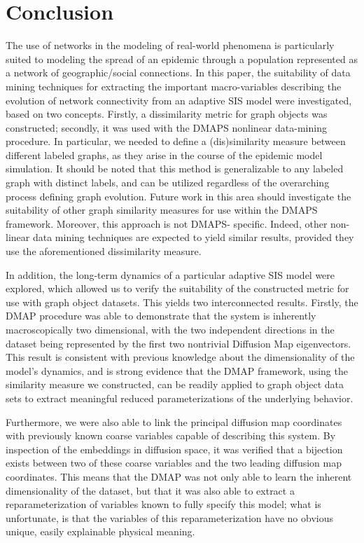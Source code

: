 \section{Conclusion}

The use of networks in the modeling of real-world phenomena is
particularly suited to modeling the spread of an epidemic through a
population represented as a network of geographic/social
connections. In this paper, the suitability of data mining techniques
for extracting the important macro-variables describing the evolution
of network connectivity from an adaptive SIS model were investigated,
based on two concepts. Firstly, a dissimilarity metric for graph
objects was constructed; secondly, it was used with the DMAPS
nonlinear data-mining procedure. In particular, we needed to define a
(dis)similarity measure between different labeled graphs, as they
arise in the course of the epidemic model simulation. It should be
noted that this method is generalizable to any labeled graph with
distinct labels, and can be utilized regardless of the overarching
process defining graph evolution. Future work in this area should
investigate the suitability of other graph similarity measures for use
within the DMAPS framework. Moreover, this approach is not DMAPS-
specific. Indeed, other non-linear data mining techniques are expected
to yield similar results, provided they use the aforementioned
dissimilarity measure.

In addition, the long-term dynamics of a particular adaptive SIS model
were explored, which allowed us to verify the suitability of the
constructed metric for use with graph object datasets. This yields two
interconnected results. Firstly, the DMAP procedure was able to
demonstrate that the system is inherently macroscopically two
dimensional, with the two independent directions in the dataset being
represented by the first two nontrivial Diffusion Map
eigenvectors. This result is consistent with previous knowledge about
the dimensionality of the model’s dynamics, and is strong evidence
that the DMAP framework, using the similarity measure we constructed,
can be readily applied to graph object data sets to extract meaningful
reduced parameterizations of the underlying behavior.

Furthermore, we were also able to link the principal diffusion map
coordinates with previously known coarse variables capable of
describing this system. By inspection of the embeddings in diffusion
space, it was verified that a bijection exists between two of these
coarse variables and the two leading diffusion map coordinates. This
means that the DMAP was not only able to learn the inherent
dimensionality of the dataset, but that it was also able to extract a
reparameterization of variables known to fully specify this model;
what is unfortunate, is that the variables of this reparameterization
have no obvious unique, easily explainable physical meaning.

